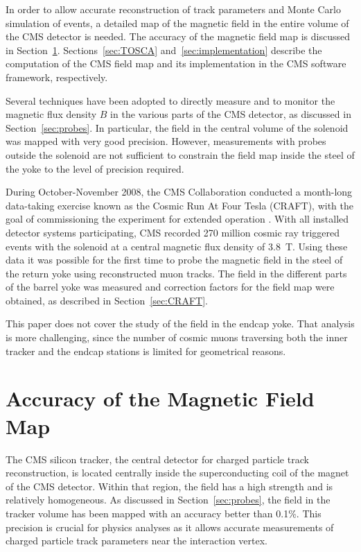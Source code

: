 In order to allow accurate reconstruction of track parameters and
Monte Carlo simulation of events, a detailed map of the magnetic
field in the entire volume of the CMS detector is needed.
The accuracy of the magnetic field map is
discussed in Section~\ref{sec:requirements}.
Sections~\ref{sec:TOSCA} and~\ref{sec:implementation} describe the
computation of the CMS field map and its implementation in the CMS
software framework, respectively.

Several techniques have been adopted to directly measure and to monitor
the magnetic flux density $B$
in the various parts of the CMS detector, as discussed
in Section~\ref{sec:probes}.
In particular, the field in the central volume of the solenoid
was mapped with very good precision.
However, measurements with probes outside the solenoid
are not sufficient to constrain the field map inside the steel of the
yoke to the level of precision required.

During October-November 2008, the CMS Collaboration conducted a month-long
data-taking exercise known as the Cosmic Run At Four Tesla (CRAFT),
with the goal of commissioning the experiment for extended operation
\cite{CRAFTGeneral}.
With all installed detector systems participating, CMS recorded 270 million
cosmic ray triggered events with the solenoid at a central magnetic
flux density of 3.8~T.
Using these data it was possible for the first time to 
probe the magnetic field in the steel of the return yoke using
reconstructed muon tracks. The field in the different parts of
the barrel yoke was measured and correction factors for the field map
were obtained, as
described in Section~\ref{sec:CRAFT}.

This paper does not cover the study of the field in the endcap
yoke. That
analysis is more challenging, since
the number of cosmic muons traversing both the inner tracker and
the endcap stations is limited for geometrical reasons.

\section{Accuracy of the Magnetic Field Map}
\label{sec:requirements}

The CMS silicon tracker, the central detector for charged particle track reconstruction,
is located centrally inside the superconducting coil of
the magnet of the CMS detector.
Within that region, the field has a high strength and is
relatively homogeneous.
As discussed in Section~\ref{sec:probes}, the field in the tracker
volume has been mapped with an accuracy better than 0.1\%.
This precision is crucial for physics analyses
as it allows accurate measurements of charged particle track
parameters near the interaction vertex.

